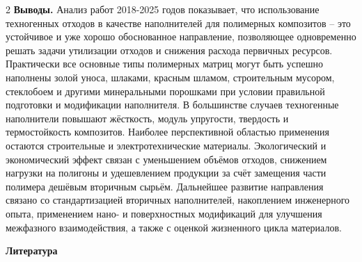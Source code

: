 \begin{multicols}{2}
{\bfseries Выводы.} Анализ работ 2018-2025 годов показывает, что
использование техногенных отходов в качестве наполнителей для полимерных
композитов -- это устойчивое и уже хорошо обоснованное направление,
позволяющее одновременно решать задачи утилизации отходов и снижения
расхода первичных ресурсов. Практически все основные типы полимерных
матриц могут быть успешно наполнены золой уноса, шлаками, красным
шламом, строительным мусором, стеклобоем и другими минеральными
порошками при условии правильной подготовки и модификации наполнителя. В
большинстве случаев техногенные наполнители повышают жёсткость, модуль
упругости, твердость и термостойкость композитов. Наиболее перспективной
областью применения остаются строительные и электротехнические
материалы. Экологический и экономический эффект связан с уменьшением
объёмов отходов, снижением нагрузки на полигоны и удешевлением продукции
за счёт замещения части полимера дешёвым вторичным сырьём. Дальнейшее
развитие направления связано со стандартизацией вторичных наполнителей,
накоплением инженерного опыта, применением нано- и поверхностных
модификаций для улучшения межфазного взаимодействия, а также с оценкой
жизненного цикла материалов.
\end{multicols}

\begin{center}
{\bfseries Литература}
\end{center}

